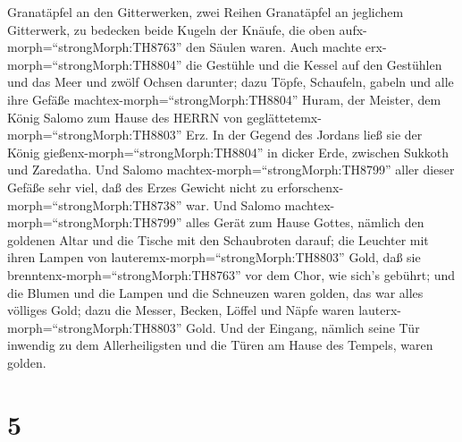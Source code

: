 Granatäpfel an den Gitterwerken, zwei Reihen Granatäpfel an jeglichem
Gitterwerk, zu bedecken beide Kugeln der Knäufe, die oben
aufx-morph=``strongMorph:TH8763'' den Säulen waren.  Auch
machte erx-morph=``strongMorph:TH8804'' die Gestühle und die Kessel auf
den Gestühlen  und das Meer und zwölf Ochsen darunter;
 dazu Töpfe, Schaufeln, gabeln und alle ihre Gefäße
machtex-morph=``strongMorph:TH8804'' Huram, der Meister, dem König
Salomo zum Hause des HERRN von geglättetemx-morph=``strongMorph:TH8803''
Erz.  In der Gegend des Jordans ließ sie der König
gießenx-morph=``strongMorph:TH8804'' in dicker Erde, zwischen Sukkoth
und Zaredatha.  Und Salomo
machtex-morph=``strongMorph:TH8799'' aller dieser Gefäße sehr viel, daß
des Erzes Gewicht nicht zu erforschenx-morph=``strongMorph:TH8738'' war.
 Und Salomo machtex-morph=``strongMorph:TH8799'' alles
Gerät zum Hause Gottes, nämlich den goldenen Altar und die Tische mit
den Schaubroten darauf;  die Leuchter mit ihren Lampen von
lauteremx-morph=``strongMorph:TH8803'' Gold, daß sie
brenntenx-morph=``strongMorph:TH8763'' vor dem Chor, wie sich's gebührt;
 und die Blumen und die Lampen und die Schneuzen waren
golden, das war alles völliges Gold;  dazu die Messer,
Becken, Löffel und Näpfe waren lauterx-morph=``strongMorph:TH8803''
Gold. Und der Eingang, nämlich seine Tür inwendig zu dem Allerheiligsten
und die Türen am Hause des Tempels, waren golden.

\hypertarget{section-4}{%
\section{5}\label{section-4}}

